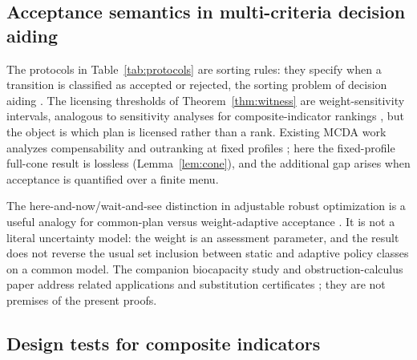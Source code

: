 \subsection{Acceptance semantics in multi-criteria decision aiding}\label{sec:mcda}

The protocols in Table~\ref{tab:protocols} are sorting rules: they specify when a transition is classified as accepted or rejected, the sorting problem of decision aiding \citep{Roy1996,Vincke1992}. The licensing thresholds of Theorem~\ref{thm:witness} are weight-sensitivity intervals, analogous to sensitivity analyses for composite-indicator rankings \citep{Nardo2008,Becker2017}, but the object is which plan is licensed rather than a rank. Existing MCDA work analyzes compensability and outranking at fixed profiles \citep{Cinelli2014,Schar2025}; here the fixed-profile full-cone result is lossless (Lemma~\ref{lem:cone}), and the additional gap arises when acceptance is quantified over a finite menu.

The here-and-now/wait-and-see distinction in adjustable robust optimization is a useful analogy for common-plan versus weight-adaptive acceptance \citep{BenTal2004}. It is not a literal uncertainty model: the weight is an assessment parameter, and the result does not reverse the usual set inclusion between static and adaptive policy classes on a common model. The companion biocapacity study and obstruction-calculus paper address related applications and substitution certificates \citep{Abaee2026ecomod,Abaee2026obs}; they are not premises of the present proofs.

\subsection{Design tests for composite indicators}\label{sec:design}

